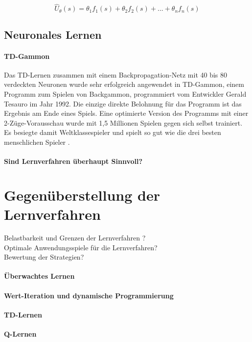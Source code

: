 \begin{equation*}
\hat{U}_\theta(s) = \theta_1 f_1(s) + \theta_2 f_2(s) + ... + \theta_n f_n(s)
\end{equation*}

\subsection{Neuronales Lernen}
\label{subsec:Neuronales Lernen}

\paragraph{TD-Gammon}
Das TD-Lernen zusammen mit einem Backpropagation-Netz mit 40 bis 80 verdeckten Neuronen wurde sehr erfolgreich angewendet in TD-Gammon, einem Programm zum Spielen von Backgammon, programmiert vom Entwickler Gerald Tesauro im Jahr 1992. Die einzige direkte Belohnung für das Programm ist das Ergebnis am Ende eines Spiels. Eine optimierte Version des Programms mit einer 2-Züge-Vorausschau wurde mit 1,5 Millionen Spielen gegen sich selbst trainiert. Es besiegte damit Weltklassespieler und spielt so gut wie die drei besten menschlichen Spieler \cite[304]{Ertel}.  

\paragraph{Sind Lernverfahren überhaupt Sinnvoll?}

\section{Gegenüberstellung der Lernverfahren}
Belastbarkeit und Grenzen der Lernverfahren ? \\
Optimale Anwendungsspiele für die Lernverfahren? \\
Bewertung der Strategien?
\paragraph{Überwachtes Lernen}
\paragraph{Wert-Iteration und dynamische Programmierung}
\paragraph{TD-Lernen}
\paragraph{Q-Lernen}
